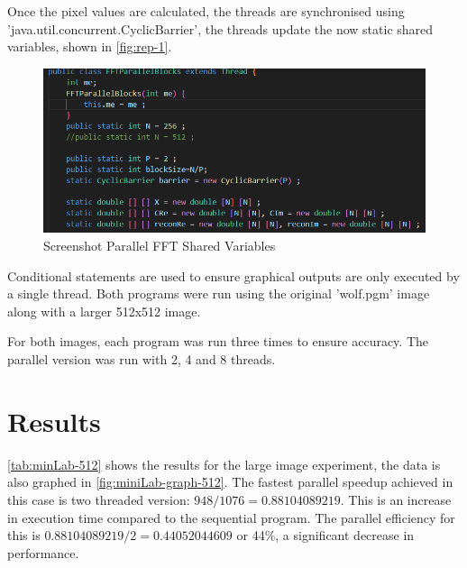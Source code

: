 Once the pixel values are calculated, the threads are synchronised using 'java.util.concurrent.CyclicBarrier', the threads update the now static shared variables, shown in \autoref{fig:rep-1}.
\begin{figure}[H] 
    \centering
    \includegraphics[width=0.9\columnwidth]{Figures/Report/1.png}
    \caption{Screenshot Parallel FFT Shared Variables }
    \label{fig:rep-1}
\end{figure}
Conditional statements are used to ensure graphical outputs are only executed by a single thread. Both programs were run using the original 'wolf.pgm' image along with a larger 512x512 image.

For both images, each program was run three times to ensure accuracy.
The parallel version was run with 2, 4 and 8 threads.

\section{Results}

\autoref{tab:minLab-512} shows the results for the large image experiment, the data is also graphed in \autoref{fig:miniLab-graph-512}. The fastest parallel speedup achieved in this case is two threaded version: $948/1076 = 0.88104089219$. This is an increase in execution time compared to the sequential program. The parallel efficiency for this is $0.88104089219 / 2 = 0.44052044609$ or 44\%, a significant decrease in performance.



